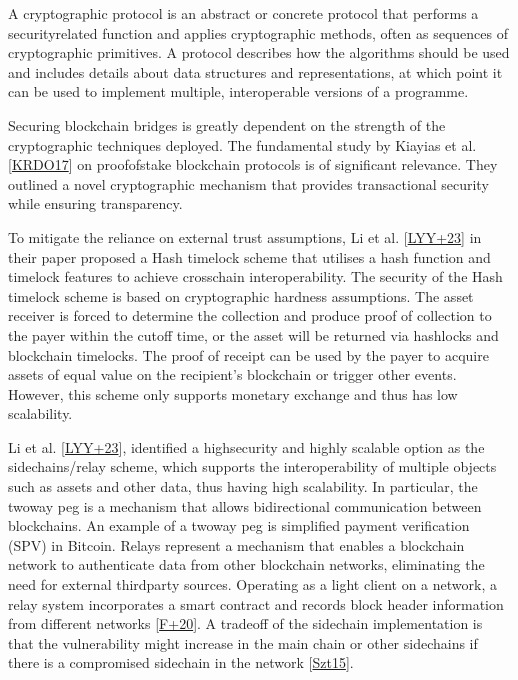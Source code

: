 \documentclass[letterpaper,10pt,english]{jupyterBook}
\begin{document}
\begin{sphinxShadowBox}

\sphinxAtStartPar
A cryptographic protocol is an abstract or concrete protocol that performs a security\sphinxhyphen{}related function and applies cryptographic methods, often as sequences of cryptographic primitives. A protocol describes how the algorithms should be used and includes details about data structures and representations, at which point it can be used to implement multiple, interoperable versions of a programme.
\end{sphinxShadowBox}

\sphinxAtStartPar
Securing blockchain bridges is greatly dependent on the strength of the cryptographic techniques deployed. The fundamental study by Kiayias et al. {[}\hyperlink{cite.BBSecurity/bbsecurity:id91}{KRDO17}{]} on proof\sphinxhyphen{}of\sphinxhyphen{}stake blockchain protocols is of significant relevance. They outlined a novel cryptographic mechanism that provides transactional security while ensuring transparency.

\sphinxAtStartPar
To mitigate the reliance on external trust assumptions, Li et al. {[}\hyperlink{cite.BBSecurity/bbsecurity:id92}{LYY+23}{]} in their paper proposed a Hash time\sphinxhyphen{}lock scheme that utilises a hash function and time\sphinxhyphen{}lock features to achieve cross\sphinxhyphen{}chain interoperability. The security of the Hash time\sphinxhyphen{}lock scheme is based on cryptographic hardness assumptions. The asset receiver is forced to determine the collection and produce proof of collection to the payer within the cut\sphinxhyphen{}off time, or the asset will be returned via hash\sphinxhyphen{}locks and blockchain time\sphinxhyphen{}locks. The proof of receipt can be used by the payer to acquire assets of equal value on the recipient’s blockchain or trigger other events. However, this scheme only supports monetary exchange and thus has low scalability.

\sphinxAtStartPar
Li et al. {[}\hyperlink{cite.BBSecurity/bbsecurity:id92}{LYY+23}{]}, identified a high\sphinxhyphen{}security and highly scalable option as the sidechains/relay scheme, which supports the interoperability of multiple objects such as assets and other data, thus having high scalability. In particular, the two\sphinxhyphen{}way peg is a mechanism that allows bidirectional communication between blockchains. An example of a two\sphinxhyphen{}way peg is simplified payment verification (SPV) in Bitcoin. Relays represent a mechanism that enables a blockchain network to authenticate data from other blockchain networks, eliminating the need for external third\sphinxhyphen{}party sources. Operating as a light client on a network, a relay system incorporates a smart contract and records block header information from different networks {[}\hyperlink{cite.BBSecurity/bbsecurity:id93}{F+20}{]}. A trade\sphinxhyphen{}off of the sidechain implementation is that the vulnerability might increase in the main chain or other sidechains if there is a compromised sidechain in the network {[}\hyperlink{cite.BBSecurity/bbsecurity:id94}{Szt15}{]}.
\end{document}
